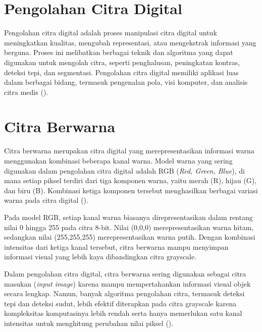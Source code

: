 \section{Pengolahan Citra Digital}
  Pengolahan citra digital adalah proses manipulasi citra digital untuk meningkatkan kualitas, mengubah representasi, atau mengekstrak informasi yang berguna. Proses ini melibatkan berbagai teknik dan algoritma yang dapat digunakan untuk mengolah citra, seperti penghalusan, peningkatan kontras, deteksi tepi, dan segmentasi. Pengolahan citra digital memiliki aplikasi luas dalam berbagai bidang, termasuk pengenalan pola, visi komputer, dan analisis citra medis (\cite{Gonzalez2018}). 




\section{Citra Berwarna}
Citra berwarna merupakan citra digital yang merepresentasikan informasi warna menggunakan kombinasi beberapa kanal warna. 
Model warna yang sering digunakan dalam pengolahan citra digital adalah RGB (\emph{Red, Green, Blue}), di mana setiap piksel terdiri dari tiga komponen warna, yaitu merah (R), hijau (G), dan biru (B). 
Kombinasi ketiga komponen tersebut menghasilkan berbagai variasi warna pada citra digital (\cite{Gonzalez2018}).

Pada model RGB, setiap kanal warna biasanya direpresentasikan dalam rentang nilai 0 hingga 255 pada citra 8-bit.
Nilai (0,0,0) merepresentasikan warna hitam, sedangkan nilai (255,255,255) merepresentasikan warna putih. Dengan kombinasi intensitas dari ketiga kanal tersebut, citra berwarna mampu menyimpan informasi visual yang lebih kaya dibandingkan citra grayscale.

Dalam pengolahan citra digital, citra berwarna sering digunakan sebagai citra masukan (\emph{input image}) karena mampu mempertahankan informasi visual objek secara lengkap.
Namun, banyak algoritma pengolahan citra, termasuk deteksi tepi dan deteksi sudut, lebih efektif diterapkan pada citra grayscale karena kompleksitas komputasinya lebih rendah serta hanya memerlukan satu kanal intensitas untuk menghitung perubahan nilai piksel (\cite{Sanchez2018}).

